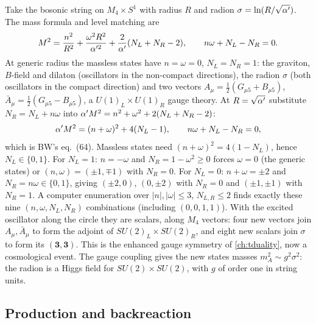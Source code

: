 Take the bosonic string on $M_4\times S^1$ with radius $R$ and radion
$\sigma=\ln(R/\sqrt{\alpha'})$. The mass formula and level matching are
\begin{equation}\label{eq:cosmology:M59}
 M^2=\frac{n^2}{R^2}+\frac{\omega^2R^2}{\alpha'^2}+\frac2{\alpha'}(N_L+N_R-2),\qquad n\omega+N_L-N_R=0 .
\end{equation}
At generic radius the massless states have $n=\omega=0$, $N_L=N_R=1$: the graviton,
$B$-field and dilaton (oscillators in the non-compact directions), the radion $\sigma$ (both
oscillators in the compact direction) and two vectors $A_\mu=\tfrac12(G_{\mu5}+B_{\mu5})$,
$\bar A_\mu=\tfrac12(G_{\mu5}-B_{\mu5})$, a $U(1)_L\times U(1)_R$ gauge theory.
 At $R=\sqrt{\alpha'}$ substitute
$N_R=N_L+n\omega$ into $\alpha' M^2=n^2+\omega^2+2(N_L+N_R-2)$:
\begin{equation}\label{eq:cosmology:M64}
 \alpha' M^2=(n+\omega)^2+4(N_L-1),\qquad n\omega+N_L-N_R=0 ,
\end{equation}
which is BW's eq.~(64).  Massless states need
$(n+\omega)^2=4(1-N_L)$, hence $N_L\in\{0,1\}$. For $N_L=1$: $n=-\omega$ and $N_R=1-\omega^2\ge0$
forces $\omega=0$ (the generic states) or $(n,\omega)=(\pm1,\mp1)$ with $N_R=0$. For $N_L=0$:
$n+\omega=\pm2$ and $N_R=n\omega\in\{0,1\}$, giving $(\pm2,0)$, $(0,\pm2)$ with $N_R=0$ and
$(\pm1,\pm1)$ with $N_R=1$. A computer enumeration over $|n|,|\omega|\le3$, $N_{L,R}\le2$
finds exactly these nine $(n,\omega,N_L,N_R)$ combinations (including $(0,0,1,1)$). With
the excited oscillator along the circle they are scalars, along $M_4$ vectors: four new
vectors join $A_\mu,\bar A_\mu$ to form the adjoint of $SU(2)_L\times SU(2)_R$, and eight
new scalars join $\sigma$ to form its $(\mathbf3,\mathbf3)$. 
This is the enhanced gauge symmetry of \cref{ch:tduality}, now a cosmological event. The
gauge coupling gives the new states masses $m_A^2\sim g^2\sigma^2$: the radion is a Higgs
field for $SU(2)\times SU(2)$, with $g$ of order one in string units.

\subsection{Production and backreaction}

